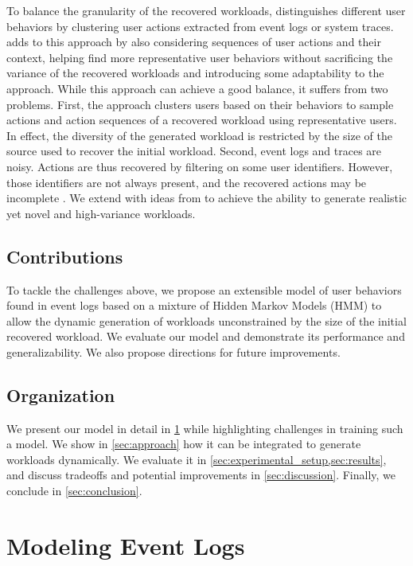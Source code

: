 To balance the granularity of the recovered workloads, \cite{Syer2017-ek, Vogele2018-zz, Summers2016-jj, Xi2011-ki, Hassan2008-nj} distinguishes different user behaviors by clustering user actions extracted from event logs or system traces. \cite{Chen2019-fu} adds to this approach by also considering sequences of user actions and their context, helping find more representative user behaviors without sacrificing the variance of the recovered workloads and introducing some adaptability to the approach. While this approach can achieve a good balance, it suffers from two problems. First, the approach clusters users based on their behaviors to sample actions and action sequences of a recovered workload using representative users. In effect, the diversity of the generated workload is restricted by the size of the source used to recover the initial workload. Second, event logs and traces are noisy. Actions are thus recovered by filtering on some user identifiers. However, those identifiers are not always present, and the recovered actions may be incomplete \cite{Zhao2023-nh}. We extend \cite{Chen2019-fu} with ideas from \cite{Yadwadkar2010-ml} to achieve the ability to generate realistic yet novel and high-variance workloads.

\subsection{Contributions}

To tackle the challenges above, we propose an extensible model of user behaviors found in event logs based on a mixture of Hidden Markov Models (HMM) to allow the dynamic generation of workloads unconstrained by the size of the initial recovered workload. We evaluate our model and demonstrate its performance and generalizability. We also propose directions for future improvements.

\subsection{Organization}

We present our model in detail in \cref{sec:modeling_processes} while highlighting challenges in training such a model. We show in \cref{sec:approach} how it can be integrated to generate workloads dynamically. We evaluate it in \cref{sec:experimental_setup,sec:results}, and discuss tradeoffs and potential improvements in \cref{sec:discussion}. Finally, we conclude in \cref{sec:conclusion}.

\section{Modeling Event Logs}\label{sec:modeling_processes}

